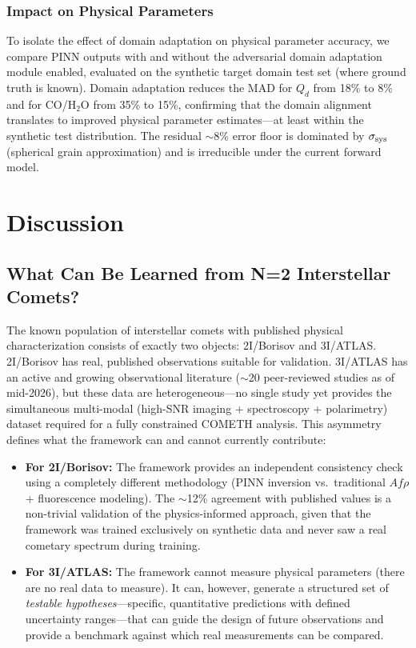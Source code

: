 \documentclass[usenatbib]{mnras}
\begin{document}
\subsubsection{Impact on Physical Parameters}

To isolate the effect of domain adaptation on physical parameter accuracy, we compare PINN outputs with and without the adversarial domain adaptation module enabled, evaluated on the synthetic target domain test set (where ground truth is known). Domain adaptation reduces the MAD for $Q_d$ from 18\% to 8\% and for CO/H$_2$O from 35\% to 15\%, confirming that the domain alignment translates to improved physical parameter estimates---at least within the synthetic test distribution. The residual $\sim$8\% error floor is dominated by $\sigma_{\rm sys}$ (spherical grain approximation) and is irreducible under the current forward model.

\section{Discussion}\label{sec:discussion}

\subsection{What Can Be Learned from N=2 Interstellar Comets?}

The known population of interstellar comets with published physical characterization consists of exactly two objects: 2I/Borisov and 3I/ATLAS. 2I/Borisov has real, published observations suitable for validation. 3I/ATLAS has an active and growing observational literature ($\sim$20 peer-reviewed studies as of mid-2026), but these data are heterogeneous---no single study yet provides the simultaneous multi-modal (high-SNR imaging + spectroscopy + polarimetry) dataset required for a fully constrained COMETH analysis. This asymmetry defines what the framework can and cannot currently contribute:

\begin{itemize}
    \item \textbf{For 2I/Borisov:} The framework provides an independent consistency check using a completely different methodology (PINN inversion vs.\ traditional $Af\rho$ + fluorescence modeling). The $\sim$12\% agreement with published values is a non-trivial validation of the physics-informed approach, given that the framework was trained exclusively on synthetic data and never saw a real cometary spectrum during training.
    \item \textbf{For 3I/ATLAS:} The framework cannot measure physical parameters (there are no real data to measure). It can, however, generate a structured set of \textit{testable hypotheses}---specific, quantitative predictions with defined uncertainty ranges---that can guide the design of future observations and provide a benchmark against which real measurements can be compared.
\end{itemize}
\end{document}
